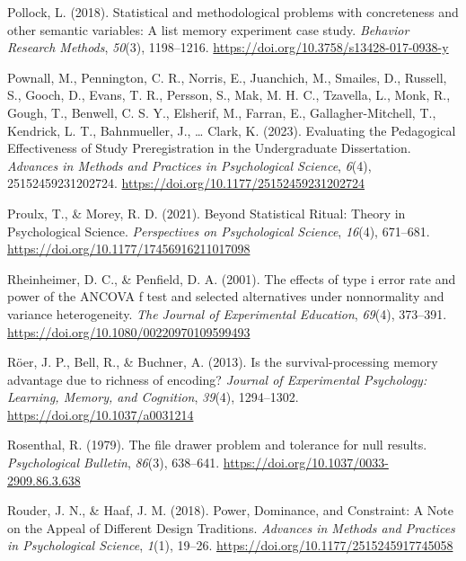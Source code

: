 \documentclass[
  man]{apa7}
\newlength{\cslhangindent}
\newenvironment{CSLReferences}[2] %
 {\begin{list}{}{%
  \setlength{\itemindent}{0pt}
  \setlength{\leftmargin}{0pt}
  \setlength{\parsep}{0pt}
  \ifodd #1
   \setlength{\leftmargin}{\cslhangindent}
   \setlength{\itemindent}{-1\cslhangindent}
  \fi
  \setlength{\itemsep}{#2\baselineskip}}}
 {\end{list}}
\begin{document}
\begin{CSLReferences}{1}{0}
Pollock, L. (2018). Statistical and methodological problems with concreteness and other semantic variables: A list memory experiment case study. \emph{Behavior Research Methods}, \emph{50}(3), 1198--1216. \url{https://doi.org/10.3758/s13428-017-0938-y}

Pownall, M., Pennington, C. R., Norris, E., Juanchich, M., Smailes, D., Russell, S., Gooch, D., Evans, T. R., Persson, S., Mak, M. H. C., Tzavella, L., Monk, R., Gough, T., Benwell, C. S. Y., Elsherif, M., Farran, E., Gallagher-Mitchell, T., Kendrick, L. T., Bahnmueller, J., \ldots{} Clark, K. (2023). Evaluating the Pedagogical Effectiveness of Study Preregistration in the Undergraduate Dissertation. \emph{Advances in Methods and Practices in Psychological Science}, \emph{6}(4), 25152459231202724. \url{https://doi.org/10.1177/25152459231202724}

Proulx, T., \& Morey, R. D. (2021). Beyond Statistical Ritual: Theory in Psychological Science. \emph{Perspectives on Psychological Science}, \emph{16}(4), 671--681. \url{https://doi.org/10.1177/17456916211017098}

Rheinheimer, D. C., \& Penfield, D. A. (2001). The effects of type i error rate and power of the ANCOVA f test and selected alternatives under nonnormality and variance heterogeneity. \emph{The Journal of Experimental Education}, \emph{69}(4), 373--391. \url{https://doi.org/10.1080/00220970109599493}

Röer, J. P., Bell, R., \& Buchner, A. (2013). Is the survival-processing memory advantage due to richness of encoding? \emph{Journal of Experimental Psychology: Learning, Memory, and Cognition}, \emph{39}(4), 1294--1302. \url{https://doi.org/10.1037/a0031214}

Rosenthal, R. (1979). The file drawer problem and tolerance for null results. \emph{Psychological Bulletin}, \emph{86}(3), 638--641. \url{https://doi.org/10.1037/0033-2909.86.3.638}

Rouder, J. N., \& Haaf, J. M. (2018). Power, Dominance, and Constraint: A Note on the Appeal of Different Design Traditions. \emph{Advances in Methods and Practices in Psychological Science}, \emph{1}(1), 19--26. \url{https://doi.org/10.1177/2515245917745058}


\end{CSLReferences}
\end{document}
